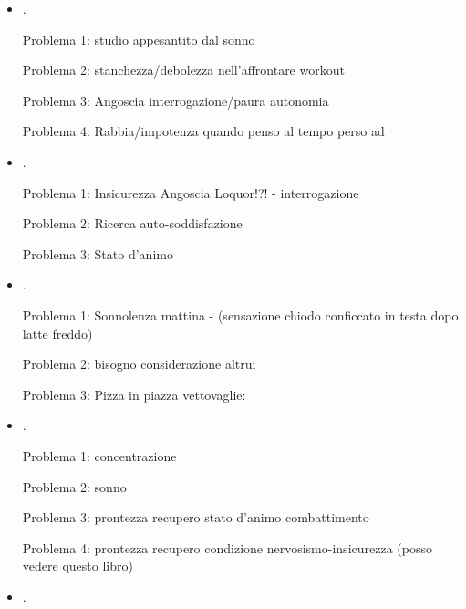 \begin{itemize}
Problema 1: Ossesione tette M

Problema 2: Stanchezza-caldo-acidit\'a

Problema 3: sonno-noia-non ho obiettivo

Problema 4: Malessere dopo workout addominali: acidit\'a-vertigini, capogiri, sonnolenza, ...


\item {}.


Problema 1: studio appesantito dal sonno

Problema 2: stanchezza/debolezza nell'affrontare workout

Problema 3: Angoscia interrogazione/paura autonomia

Problema 4: Rabbia/impotenza quando penso al tempo perso ad 

\item {}.

Problema 1: Insicurezza Angoscia Loquor!?! - interrogazione

Problema 2: Ricerca auto-soddisfazione

Problema 3: Stato d'animo 

\item {}.

Problema 1: Sonnolenza mattina -  (sensazione chiodo conficcato in testa dopo latte freddo)

Problema 2: bisogno considerazione altrui

Problema 3: Pizza in piazza vettovaglie:  

\item {}.

Problema 1: concentrazione

Problema 2: sonno

Problema 3: prontezza recupero stato d'animo combattimento

Problema 4: prontezza recupero condizione nervosismo-insicurezza (posso vedere questo libro)

\item {}.


\end{itemize}
